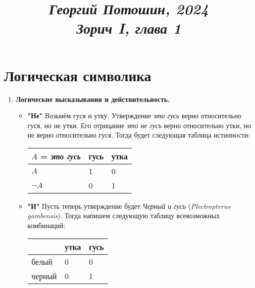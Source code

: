 \documentclass{article}
\title{
\textit{\small{Георгий Потошин, 2024}}\\
\vspace{0.3ex}
\textit{\huge{Зорич I, глава 1}}\vspace{1ex}
}
\date{\vspace{-10ex}}
\begin{document}
\maketitle

\section{Логическая символика}

\begin{enumerate}
    \item \textbf{Логические высказывания и действительность.}
        \begin{itemize}
            \item \textbf{"Не"} Возьмём гуся и утку. Утверждение \emph{это гусь}
                верно относительно гуся, но не утки. Его отрицание \emph{это не
                гусь} верно относительно утки, но не верно относительно гуся.
                Тогда будет следующая таблица истинности:\par
                \begin{center}
                \begin{tabular}{ |p{2cm}||p{1cm}|p{1cm}| }
                    \hline
                    $A$ = \emph{это гусь} & гусь & утка\\
                    \hline
                    $A$ & 1 & 0\\
                    \hline
                    $\neg A$ & 0 & 1\\
                    \hline
                \end{tabular}
                \end{center}
            \item \textbf{"И"} Пусть теперь утверждение будет \emph{Черный и
                гусь} (\textit{Plectropterus gambensis}). Тогда напишем
                следующую таблицу всевозможных комбинаций:
                \begin{center}
                    \begin{tabular}{|p{1cm}|p{1cm}|p{1cm}|}
                        \hline
                        & утка & гусь\\
                        \hline
                        белый & 0 & 0\\
                        \hline
                        черный & 0 & 1\\
                        \hline
                    \end{tabular}
                \end{center}

\end{itemize}
\end{enumerate}
\end{document}
